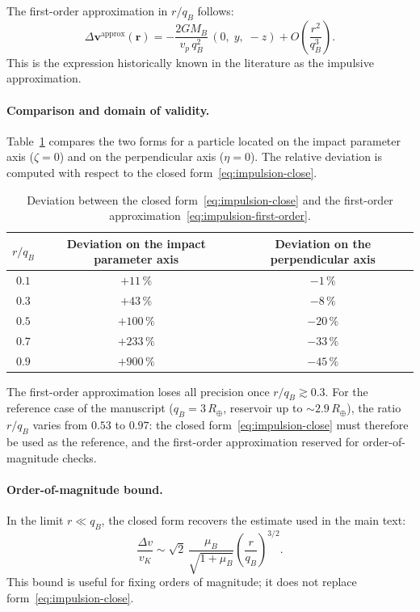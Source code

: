 \documentclass[11pt,a4paper,openany]{report}
\newcommand{\Rt}{R_{\oplus}}
\begin{document}
The first-order approximation in $r/q_B$ follows:
\begin{equation}
\Delta\mathbf{v}^{\text{approx}}(\mathbf{r})
=
-\frac{2GM_B}{v_p\,q_B^2}\,(0,\;y,\;-z)
+
O\!\left(\frac{r^2}{q_B^3}\right).
\label{eq:impulsion-first-order}
\end{equation}
This is the expression historically known in the literature as the impulsive approximation.

\paragraph{Comparison and domain of validity.}
Table~\ref{tab:impulsion-validity} compares the two forms for a particle located on the impact
parameter axis ($\zeta=0$) and on the perpendicular axis ($\eta=0$). The relative deviation is
computed with respect to the closed form~\eqref{eq:impulsion-close}.

\begin{table}[htbp]
\centering
\small
\caption{Deviation between the closed form~\eqref{eq:impulsion-close} and the first-order
approximation~\eqref{eq:impulsion-first-order}.}
\label{tab:impulsion-validity}
\begin{tabular}{ccc}
\toprule
$r/q_B$ & Deviation on the impact parameter axis & Deviation on the perpendicular axis \\
\midrule
$0.1$ & $+11\,\%$ & $-1\,\%$ \\
$0.3$ & $+43\,\%$ & $-8\,\%$ \\
$0.5$ & $+100\,\%$ & $-20\,\%$ \\
$0.7$ & $+233\,\%$ & $-33\,\%$ \\
$0.9$ & $+900\,\%$ & $-45\,\%$ \\
\bottomrule
\end{tabular}
\end{table}

The first-order approximation loses all precision once $r/q_B\gtrsim0.3$. For the reference case of
the manuscript ($q_B=3\,\Rt$, reservoir up to $\sim2.9\,\Rt$), the ratio $r/q_B$ varies from $0.53$
to $0.97$: the closed form~\eqref{eq:impulsion-close} must therefore be used as the reference, and
the first-order approximation reserved for order-of-magnitude checks.

\paragraph{Order-of-magnitude bound.}
In the limit $r\ll q_B$, the closed form recovers the estimate used in the main text:
\begin{equation}
\frac{\Delta v}{v_K}\sim\sqrt2\,\frac{\mu_B}{\sqrt{1+\mu_B}}
\left(\frac{r}{q_B}\right)^{3/2}.
\label{eq:impulsion-bound}
\end{equation}
This bound is useful for fixing orders of magnitude; it does not replace
form~\eqref{eq:impulsion-close}.
\end{document}
